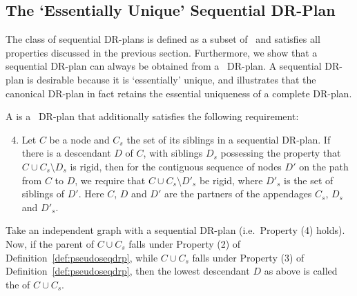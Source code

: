 \subsection{The `Essentially Unique' Sequential DR-Plan}

The class of sequential DR-plans is defined as a subset of \pseudosequential\ and satisfies all properties discussed in the previous section. Furthermore, we show that a sequential DR-plan can always be obtained from a \pseudosequential\ DR-plan. A sequential DR-plan is desirable because it is `essentially' unique, and illustrates that the canonical DR-plan in fact retains the essential uniqueness of a complete DR-plan.

\begin{definition}
\label{def:seqdrp}
    A  is a \pseudosequential\ DR-plan that additionally satisfies the following requirement:

    \begin{enumerate}
        \setcounter{enumi}{3}
        \item Let $C$ be a node and $C_s$ the set of its siblings in a sequential DR-plan. If there is a descendant $D$ of $C$, with siblings $D_s$  possessing the property that $C\cup C_s\setminus D_s$ is rigid, then for the contiguous sequence of nodes $D'$ on the path from $C$ to $D$, we require that $C\cup C_s \setminus D'_s$ be rigid, where $D'_s$ is the set of siblings of $D'$. Here $C$, $D$ and $D'$ are the partners of the appendages $C_s$, $D_s$ and $D'_s$.
    \end{enumerate}

    Take an independent graph with a sequential DR-plan (i.e.\ Property (4) holds). Now, if the parent of $C\cup C_s$ falls under Property (2) of Definition~\ref{def:pseudoseqdrp}, while $C\cup C_s$ falls under Property (3) of Definition~\ref{def:pseudoseqdrp}, then the lowest descendant $D$ as above is called the  of $C\cup C_s$.
\end{definition}

